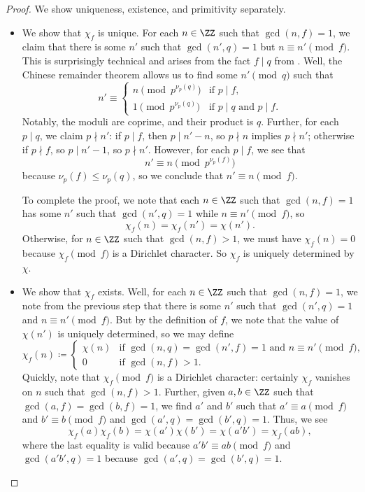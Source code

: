 \documentclass[../notes.tex]{subfiles}
\begin{document}
\begin{proof}
	We show uniqueness, existence, and primitivity separately.
	\begin{itemize}
		\item We show that $\chi_f$ is unique. For each $n\in\ZZ$ such that $\gcd(n,f)=1$, we claim that there is some $n'$ such that $\gcd(n',q)=1$ but $n\equiv n'\pmod f$. This is surprisingly technical and arises from the fact $f\mid q$ from . Well, the Chinese remainder theorem allows us to find some $n'\pmod q$ such that
		\[n'\equiv\begin{cases}
			n \pmod{p^{\nu_p(q)}} & \text{if }p\mid f, \\
			1 \pmod{p^{\nu_p(q)}} & \text{if }p\mid q\text{ and }p\mid f.
		\end{cases}\]
		Notably, the moduli are coprime, and their product is $q$. Further, for each $p\mid q$, we claim $p\nmid n'$: if $p\mid f$, then $p\mid n'-n$, so $p\nmid n$ implies $p\nmid n'$; otherwise if $p\nmid f$, so $p\mid n'-1$, so $p\nmid n'$. However, for each $p\mid f$, we see that
		\[n'\equiv n\pmod{p^{\nu_p(f)}}\]
		because $\nu_p(f)\le\nu_p(q)$, so we conclude that $n'\equiv n\pmod f$.

		To complete the proof, we note that each $n\in\ZZ$ such that $\gcd(n,f)=1$ has some $n'$ such that $\gcd(n',q)=1$ while $n\equiv n'\pmod f$, so
		\[\chi_f(n)=\chi_f(n')=\chi(n').\]
		Otherwise, for $n\in\ZZ$ such that $\gcd(n,f)>1$, we must have $\chi_f(n)=0$ because $\chi_f\pmod f$ is a Dirichlet character. So $\chi_f$ is uniquely determined by $\chi$.

		\item We show that $\chi_f$ exists. Well, for each $n\in\ZZ$ such that $\gcd(n,f)=1$, we note from the previous step that there is some $n'$ such that $\gcd(n',q)=1$ and $n\equiv n'\pmod f$. But by the definition of $f$, we note that the value of $\chi(n')$ is uniquely determined, so we may define
		\[\chi_f(n)\coloneqq\begin{cases}
			\chi(n) & \text{if }\gcd(n,q)=\gcd(n',f)=1\text{ and }n\equiv n'\pmod f, \\
			0 & \text{if }\gcd(n,f)>1.
		\end{cases}\]
		Quickly, note that $\chi_f\pmod f$ is a Dirichlet character: certainly $\chi_f$ vanishes on $n$ such that $\gcd(n,f)>1$. Further, given $a,b\in\ZZ$ such that $\gcd(a,f)=\gcd(b,f)=1$, we find $a'$ and $b'$ such that $a'\equiv a\pmod f$ and $b'\equiv b\pmod f$ and $\gcd(a',q)=\gcd(b',q)=1$. Thus, we see
		\[\chi_f(a)\chi_f(b)=\chi(a')\chi(b')=\chi(a'b')=\chi_f(ab),\]
		where the last equality is valid because $a'b'\equiv ab\pmod f$ and $\gcd(a'b',q)=1$ because $\gcd(a',q)=\gcd(b',q)=1$.


\end{itemize}
\end{proof}
\end{document}
